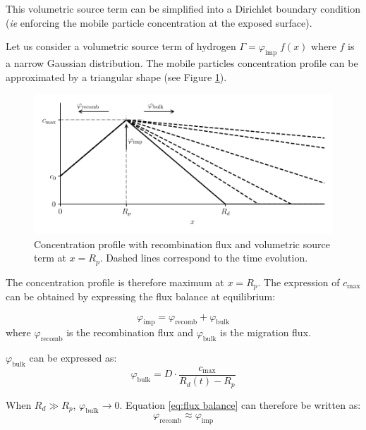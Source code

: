 This volumetric source term can be simplified into a Dirichlet boundary condition (\textit{ie} enforcing the mobile particle concentration at the exposed surface).

Let us consider a volumetric source term of hydrogen $\Gamma = \varphi_\mathrm{imp} \; f(x)$ where $f$ is a narrow Gaussian distribution.
The mobile particles concentration profile can be approximated by a triangular shape  (see Figure \ref{fig:recomb sketch}).

\begin{figure}[h!]
    \centering
    \includegraphics[width=0.75\linewidth]{Figures/Chapter2/recomb_sketch.pdf}
    \caption{Concentration profile with recombination flux and volumetric source term at $x=R_p$. Dashed lines correspond to the time evolution.}
    \label{fig:recomb sketch}
\end{figure}

The concentration profile is therefore maximum at $x=R_p$.
The expression of $c_\mathrm{max}$ can be obtained by expressing the flux balance at equilibrium:

\begin{equation}
    \varphi_\mathrm{imp} = \varphi_\mathrm{recomb} + \varphi_\mathrm{bulk}
    \label{eq:flux balance}
\end{equation}
where $\varphi_\mathrm{recomb}$ is the recombination flux and $\varphi_\mathrm{bulk}$ is the migration flux.

$\varphi_\mathrm{bulk}$ can be expressed as:
\begin{equation}
    \varphi_\mathrm{bulk} = D \cdot \frac{c_\mathrm{max}}{R_d(t) - R_p}
\end{equation}

When $R_d \gg R_p$, $\varphi_\mathrm{bulk} \rightarrow 0$.
Equation \ref{eq:flux balance} can therefore be written as:
\begin{equation}
    \varphi_\mathrm{recomb} \approx \varphi_\mathrm{imp}
    \label{eq:flux balance 2}
\end{equation}

